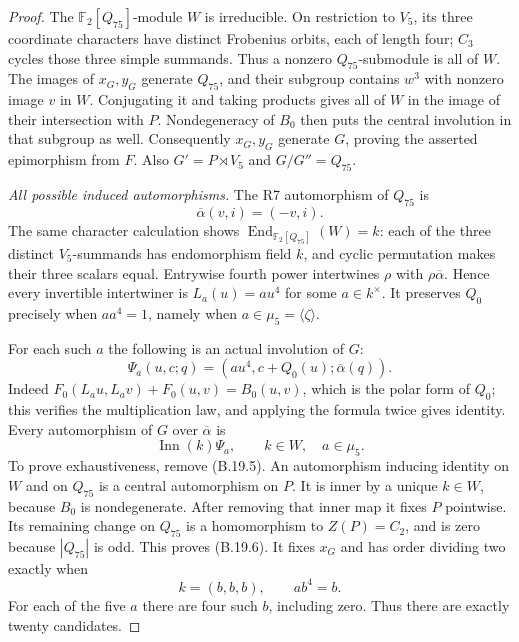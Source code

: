 \begin{proof}
The $\mathbb F_2[Q_{75}]$-module $W$ is irreducible.
On restriction to $V_5$, its three coordinate characters have
distinct Frobenius orbits, each of length four; $C_3$ cycles those
three simple summands. Thus a nonzero $Q_{75}$-submodule is all
of $W$. The images of $x_G,y_G$ generate $Q_{75}$, and their
subgroup contains $w^3$ with nonzero image $v$ in $W$.
Conjugating it and taking products gives all of $W$ in the image
of their intersection with $P$. Nondegeneracy of $B_0$ then puts
the central involution in that subgroup as well. Consequently
$x_G,y_G$ generate $G$, proving the asserted epimorphism from $F$.
Also $G'=P\rtimes V_5$ and $G/G''=Q_{75}$.

\emph{All possible induced automorphisms.}
The R7 automorphism of $Q_{75}$ is
\[
                  \overline\alpha(v,i)=(-v,i).
\]
The same character calculation shows
$\operatorname{End}_{\mathbb F_2[Q_{75}]}(W)=k$:
each of the three distinct $V_5$-summands has endomorphism field
$k$, and cyclic permutation makes their three scalars equal.
Entrywise fourth power intertwines $\rho$ with
$\rho\overline\alpha$. Hence every invertible intertwiner is
$L_a(u)=a u^4$ for some $a\in k^\times$.
It preserves $Q_0$ precisely when $aa^4=1$, namely when
$a\in\mu_5=\langle\zeta\rangle$.

For each such $a$ the following is an actual involution of $G$:
\[
 \Psi_a(u,c;q)=(a u^4,c+Q_0(u);\overline\alpha(q)).
 \tag{B.19.5}
\]
Indeed
$F_0(L_au,L_av)+F_0(u,v)=B_0(u,v)$, which is the polar form
of $Q_0$; this verifies the multiplication law, and applying the
formula twice gives identity.
Every automorphism of $G$ over $\overline\alpha$ is
\[
                        \operatorname{Inn}(k)\Psi_a,
                  \qquad k\in W,\quad a\in\mu_5.
 \tag{B.19.6}
\]
To prove exhaustiveness, remove (B.19.5). An automorphism inducing
identity on $W$ and on $Q_{75}$ is a central automorphism on $P$.
It is inner by a unique $k\in W$, because $B_0$ is nondegenerate.
After removing that inner map it fixes $P$ pointwise. Its remaining
change on $Q_{75}$ is a homomorphism to $Z(P)=C_2$, and is zero
because $|Q_{75}|$ is odd. This proves (B.19.6).
It fixes $x_G$ and has order dividing two exactly when
\[
       k=(b,b,b),\qquad a b^4=b.
 \tag{B.19.7}
\]
For each of the five $a$ there are four such $b$, including zero.
Thus there are exactly twenty candidates.


\end{proof}
